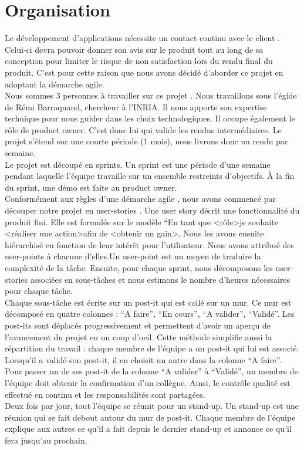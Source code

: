 \documentclass[11pt]{article}
\begin{document}
\section{Organisation}
Le développement d'applications nécessite un contact continu avec le client . Celui-ci devra pouvoir donner son avis sur le produit tout au long de sa conception pour limiter le risque de non satisfaction lors du rendu final du produit.
C'est pour cette raison que nous avons décidé d'aborder ce projet en adoptant la démarche agile.\\
Nous sommes 3 personnes à travailler sur ce projet . Nous travaillons sous l’égide de Rémi Barraquand, chercheur à l’INRIA. Il nous apporte son expertise technique pour nous guider dans les choix technologiques. Il occupe également le rôle de product owner. C'est donc lui qui valide les rendus intermédiaires. Le projet s’étend sur une courte période (1 mois), nous livrons donc un rendu par semaine.\\
Le projet est découpé en sprints. Un sprint est une période d’une semaine pendant laquelle l’équipe travaille sur un ensemble restreints d’objectifs. À la fin du sprint, une démo est faite au product owner. \\
Conformément aux règles d'une démarche agile , nous avons commencé par découper notre projet en user-stories . Une user story décrit une fonctionnalité du produit fini. Elle est formulée sur le modèle “En tant que \textless rôle\textgreater je souhaite \textless réaliser une action\textgreater afin de \textless obtenir un gain\textgreater. Nous les avons ensuite hiérarchisé en fonction de leur intérêt pour l’utilisateur. Nous avons attribué des user-points à chacune d'elles.Un user-point est un moyen de traduire la complexité de la tâche.  Ensuite, pour chaque sprint, nous décomposons les user-stories associées en sous-tâches et nous estimons le nombre d’heures nécessaires pour chaque tâche.\\
Chaque sous-tâche est écrite sur un post-it qui est collé sur un mur. Ce mur est décomposé en quatre colonnes : “A faire”, “En cours”, “A valider”, “Validé”. Les post-its sont déplacés progressivement et permettent d’avoir un aperçu de l’avancement du projet en un coup d’oeil. Cette méthode simplifie aussi la répartition du travail : chaque membre de l’équipe a un post-it qui lui est associé. Lorsqu’il a validé son post-it, il en choisit un autre dans la colonne “A faire”.\\
Pour passer un de ses post-it de la colonne “A valider” à “Validé”, un membre de l’équipe doit obtenir la confirmation d’un collègue. Ainsi, le contrôle qualité est effectué en continu et les responsabilités sont partagées.\\
Deux fois par jour, tout l’équipe se réunit pour un stand-up. Un stand-up est une réunion qui se fait debout autour du mur de post-it. Chaque membre de l’équipe explique aux autres ce qu’il a fait depuis le dernier stand-up et annonce ce qu’il fera jusqu’au prochain.\\
\end{document}
